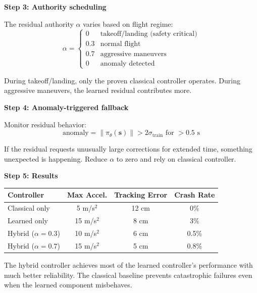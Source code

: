 \begin{example}
\textbf{Step 3: Authority scheduling}

The residual authority $\alpha$ varies based on flight regime:
\begin{equation}
\alpha = \begin{cases}
0 & \text{takeoff/landing (safety critical)} \\
0.3 & \text{normal flight} \\
0.7 & \text{aggressive maneuvers} \\
0 & \text{anomaly detected}
\end{cases}
\end{equation}

During takeoff/landing, only the proven classical controller operates. During aggressive maneuvers, the learned residual contributes more.

\textbf{Step 4: Anomaly-triggered fallback}

Monitor residual behavior:
\begin{equation}
\text{anomaly} = \|\pi_\theta(\mathbf{s})\| > 2 \sigma_{\text{train}} \text{ for } > 0.5 \text{ s}
\end{equation}

If the residual requests unusually large corrections for extended time, something unexpected is happening. Reduce $\alpha$ to zero and rely on classical controller.

\textbf{Step 5: Results}

\begin{center}
\begin{tabular}{lccc}
\toprule
\textbf{Controller} & \textbf{Max Accel.} & \textbf{Tracking Error} & \textbf{Crash Rate} \\
\midrule
Classical only & 5 m/s$^2$ & 12 cm & 0\% \\
Learned only & 15 m/s$^2$ & 8 cm & 3\% \\
Hybrid ($\alpha=0.3$) & 10 m/s$^2$ & 6 cm & 0.5\% \\
Hybrid ($\alpha=0.7$) & 15 m/s$^2$ & 5 cm & 0.8\% \\
\bottomrule
\end{tabular}
\end{center}

The hybrid controller achieves most of the learned controller's performance with much better reliability. The classical baseline prevents catastrophic failures even when the learned component misbehaves.
\end{example}

